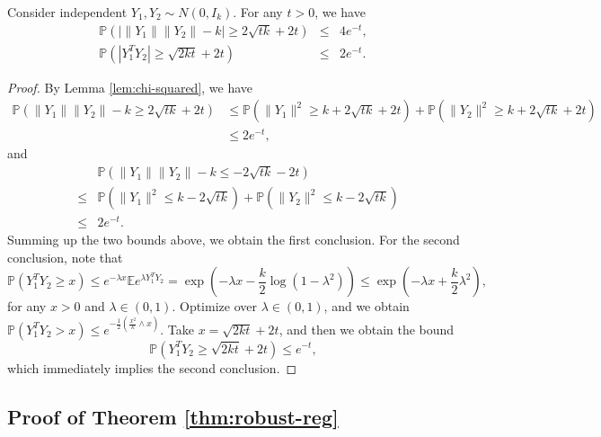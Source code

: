 \begin{lemma}\label{lem:inner-prod}
Consider independent $Y_1,Y_2\sim N(0,I_k)$. For any $t>0$, we have
\begin{eqnarray*}
\mathbb{P}\left(|\|Y_1\|\|Y_2\|-k|\geq 2\sqrt{tk}+2t\right) &\leq& 4e^{-t}, \\
\mathbb{P}\left(|Y_1^TY_2| \geq \sqrt{2kt}+2t\right) &\leq& 2e^{-t}.
\end{eqnarray*}
\end{lemma}
\begin{proof}
By Lemma \ref{lem:chi-squared}, we have
\begin{align*}
\mathbb{P}\left(\|Y_1\|\|Y_2\| -k \geq 2\sqrt{tk}+2t\right)
&\leq \mathbb{P}\left(\|Y_1\|^2 \geq k +2\sqrt{tk}+2t\right) + \mathbb{P}\left(\|Y_2\|^2 \geq k +2\sqrt{tk}+2t\right) \\
&\leq 2e^{-t},
\end{align*}
and
\begin{eqnarray*}
&& \mathbb{P}\left(\|Y_1\|\|Y_2\| -k \leq -2\sqrt{tk}-2t\right) \\
&\leq& \mathbb{P}\left(\|Y_1\|^2 \leq k -2\sqrt{tk}\right) + \mathbb{P}\left(\|Y_2\|^2 \leq k -2\sqrt{tk}\right) \\
&\leq& 2e^{-t}.
\end{eqnarray*}
Summing up the two bounds above, we obtain the first conclusion. For the second conclusion, note that
$$\mathbb{P}\left(Y_1^TY_2 \geq x\right)\leq e^{-\lambda x}\mathbb{E}e^{\lambda Y_1^TY_2}=\exp\left(-\lambda x-\frac{k}{2}\log(1-\lambda^2)\right)\leq \exp\left(-\lambda x+\frac{k}{2}\lambda^2\right),$$
for any $x>0$ and $\lambda\in (0,1)$. Optimize over $\lambda\in (0,1)$, and we obtain $\mathbb{P}\left(Y_1^TY_2>x\right)\leq e^{-\frac{1}{2}\left(\frac{x^2}{k}\wedge x\right)}$. Take $x=\sqrt{2kt}+2t$, and then we obtain the bound
$$\mathbb{P}\left(Y_1^TY_2 \geq \sqrt{2kt}+2t\right)\leq e^{-t},$$
which immediately implies the second conclusion.
\end{proof}



\subsection{Proof of Theorem \ref{thm:robust-reg}} \label{sec:pf-robust-reg}

